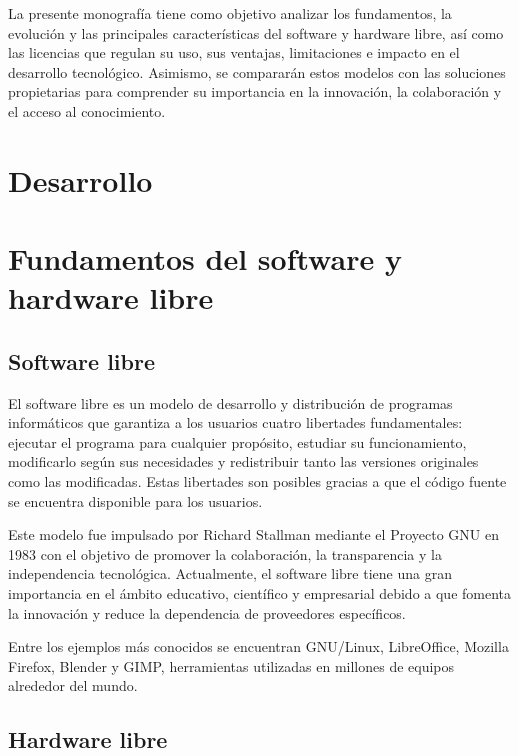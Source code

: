 \documentclass[12pt]{article}
\begin{document}
    La presente monografía tiene como objetivo analizar los fundamentos, la evolución y las principales características del software y hardware libre, así como las licencias que regulan su uso, sus ventajas, limitaciones e impacto en el desarrollo tecnológico. Asimismo, se compararán estos modelos con las soluciones propietarias para comprender su importancia en la innovación, la colaboración y el acceso al conocimiento.

	
	\section*{Desarrollo}
	
	\section{Fundamentos del software y hardware libre}
	
	\subsection{Software libre}
	
	El software libre es un modelo de desarrollo y distribución de programas informáticos que garantiza a los usuarios cuatro libertades fundamentales: ejecutar el programa para cualquier propósito, estudiar su funcionamiento, modificarlo según sus necesidades y redistribuir tanto las versiones originales como las modificadas. Estas libertades son posibles gracias a que el código fuente se encuentra disponible para los usuarios.
	
	Este modelo fue impulsado por Richard Stallman mediante el Proyecto GNU en 1983 con el objetivo de promover la colaboración, la transparencia y la independencia tecnológica. Actualmente, el software libre tiene una gran importancia en el ámbito educativo, científico y empresarial debido a que fomenta la innovación y reduce la dependencia de proveedores específicos.
	
	Entre los ejemplos más conocidos se encuentran GNU/Linux, LibreOffice, Mozilla Firefox, Blender y GIMP, herramientas utilizadas en millones de equipos alrededor del mundo.
	
	\subsection{Hardware libre}
	
\end{document}
